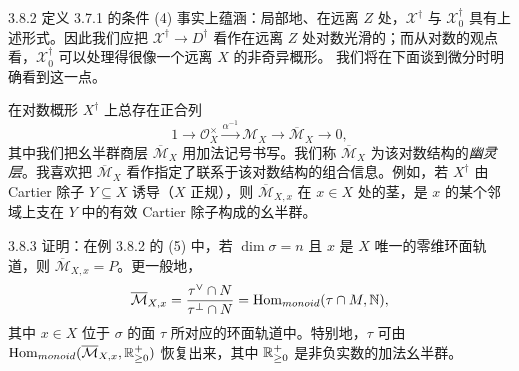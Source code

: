\begin{example}{3.8.2}
定义 3.7.1 的条件 (4) 事实上蕴涵：局部地、在远离 $Z$ 处，$\mathcal X^\dagger$ 与 $\mathcal X_0^\dagger$ 具有上述形式。因此我们应把 $\mathcal X^\dagger\to D^\dagger$ 看作在远离 $Z$ 处对数光滑的；而从对数的观点看，$\mathcal X_0^\dagger$ 可以处理得很像一个远离 $X$ 的非奇异概形。
我们将在下面谈到微分时明确看到这一点。\proofend
\end{example}

在对数概形 $X^\dagger$ 上总存在正合列
\[
1\to\mathcal O_X^\times\xrightarrow{\alpha^{-1}}\mathcal M_X\to\overline{\mathcal M}_X\to0,
\]
其中我们把幺半群商层 $\overline{\mathcal M}_X$ 用加法记号书写。我们称 $\overline{\mathcal M}_X$ 为该对数结构的\emph{幽灵层}。我喜欢把 $\overline{\mathcal M}_X$ 看作指定了联系于该对数结构的组合信息。例如，若 $X^\dagger$ 由 Cartier 除子 $Y\subseteq X$ 诱导（$X$ 正规），则 $\overline{\mathcal M}_{X,x}$ 在 $x\in X$ 处的茎，是 $x$ 的某个邻域上支在 $Y$ 中的有效 Cartier 除子构成的幺半群。

\begin{exercise}{3.8.3}
证明：在例 3.8.2 的 (5) 中，若 $\dim\sigma=n$ 且 $x$ 是 $X$ 唯一的零维环面轨道，则 $\overline{\mathcal M}_{X,x}=P$。更一般地，
\[
\overline{\mathcal M}_{X,x}=\frac{\tau^\vee\cap N}{\tau^\perp\cap N}=\operatorname{Hom}_{monoid}(\tau\cap M,\mathbb{N}),
\]
其中 $x\in X$ 位于 $\sigma$ 的面 $\tau$ 所对应的环面轨道中。特别地，$\tau$ 可由 $\operatorname{Hom}_{monoid}(\overline{\mathcal M}_{X,x},\mathbb{R}_{\ge0}^+)$ 恢复出来，其中 $\mathbb{R}_{\ge0}^+$ 是非负实数的加法幺半群。\proofend
\end{exercise}
